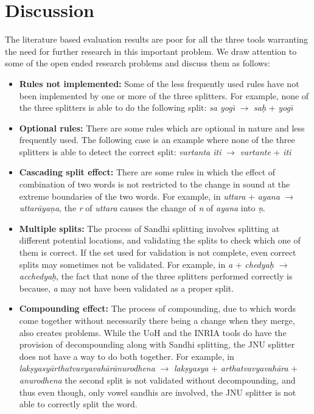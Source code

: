\documentclass[11pt]{article}
\begin{document}
\section{Discussion}
The literature based evaluation results are poor for all the three tools warranting the need for further research in this important problem. We draw attention to some of the open ended research problems and discuss them as follows:

\begin{itemize}
	\item \textbf{Rules not implemented:} Some of the less frequently used rules have not been implemented by one or more of the three splitters. For example, none of the three splitters is able to do the following split: \textit{sa yog\={\i}} $\rightarrow$ \textit{sa\d{h}} + \textit{yog\={\i}}
	
	\item \textbf{Optional rules:} There are some rules which are optional in nature and less frequently used. The following case is an example where none of the three splitters is able to detect the correct split:
	\textit{ vartanta iti} $\rightarrow$ \textit{vartante} + \textit{iti} 
	
	\item \textbf{Cascading split effect:} There are some rules in which the effect of combination of two words is not restricted to the change in sound at the extreme boundaries of the two words. For example, in
	\textit{uttara} + \textit{ayana} $\rightarrow$ \textit{uttar\={a}ya\d{n}a}, the \textit{r} of \textit{uttara} causes the change of \textit{n} of \textit{ayana} into \textit{ \d{n}}. 
	
	\item \textbf{Multiple splits:} 
	The process of Sandhi splitting involves splitting at different potential locations, and validating the splits to check which one of them is correct. If the set used for validation is not complete, even correct splits may sometimes not be validated. For example, in
	\textit{a} + \textit{chedya\d{h}} $\rightarrow$ \textit{acchedya\d{h}}, 
	the fact that none of the three splitters performed correctly is because, \textit{a} may not have been validated as a proper split.
	
	\item \textbf{Compounding effect:} The process of compounding, due to which words come together without necessarily there being a change when they merge, also creates problems. While the UoH and the INRIA tools do have the provision of decompounding along with Sandhi splitting, the JNU splitter does not have a way to do both together.
	For example, in
	\textit{lak\d{s}yasy\={a}rthatvavyavah\={a}r\={a}nurodhena} $\rightarrow$  \textit{lak\d{s}yasya} + \textit{arthatvavyavah\={a}ra} + \textit{anurodhena} 
	the second split is not validated without decompounding, and thus even though, only vowel sandhis are involved, the JNU splitter is not able to correctly split the word.  
\end{itemize}
\end{document}
